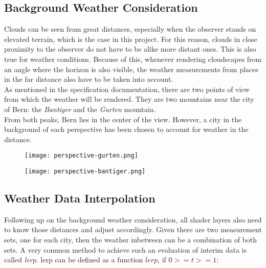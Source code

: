 \pagebreak

\subsection{Background Weather Consideration}
Clouds can be seen from great distances, especially when the observer stands on elevated terrain, which is the case in this project.
For this reason, clouds in close proximity to the observer do not have to be alike more distant ones.
This is also true for weather conditions.
Because of this, whenever rendering cloudscapes from an angle where the horizon is also visible, the weather measurements from places in the far distance also have to be taken into account.
\\
As mentioned in the specification documentation, there are two points of view from which the weather will be rendered.
They are two mountains near the city of Bern: the \emph{Bantiger} and the \emph{Gurten} mountain.
\\
From both peaks, Bern lies in the center of the view. However, a city in the background of each perspective has been chosen to account for weather in the distance.

\begin{figure}[H]
    \centering
        \begin{minipage}{0.47\linewidth}
            \texttt{[image: perspective-gurten.png]}
            \label{img:noise:fbm10_1}
        \end{minipage}
    \hfill
        \begin{minipage}{0.47\linewidth}
            \texttt{[image: perspective-bantiger.png]}
            \label{img:noise:fbm10_2}
        \end{minipage}
\end{figure}

\pagebreak

\subsection{Weather Data Interpolation}
\label{section:impl:layerinterpolation}
Following up on the background weather consideration, all \gls{shader} layers also need to know those distances and adjust accordingly.
Given there are two measurement sets, one for each city, then the weather inbetween can be a combination of both sets.
A very common method to achieve such an evaluation of interim data is called \emph{\gls{lerp}}.
\Gls{lerp} can be defined as a function $lerp$, if $0 >= t >= 1$: 

